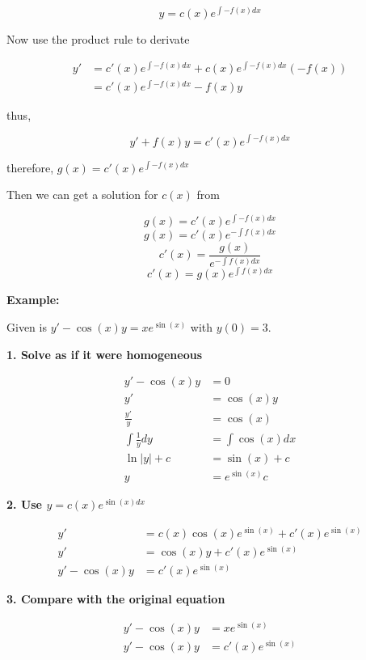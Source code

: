 \[
    y = c(x) e^{\int -f(x) dx}
\]

Now use the product rule to derivate

\begin{align*}
    y' &= c'(x) e^{\int -f(x) dx} + c(x)e^{\int -f(x) dx}(-f(x))\\
    &= c'(x)e^{\int -f(x) dx} - f(x)y
\end{align*}

thus, 

\[
    y' + f(x)y = c'(x)e^{\int -f(x) dx}
\]

therefore, \(g(x) = c'(x)e^{\int -f(x) dx}\)
\vspace{\baselineskip}

Then we can get a solution for \(c(x)\) from

\[
    g(x) = c'(x)e^{\int -f(x) dx}
\]
\[
    g(x) = c'(x)e^{-\int f(x) dx}
\]
\[
    c'(x) = \frac{g(x)}{e^{-\int f(x) dx}}
\]
\[
    c'(x) = g(x)e^{\int f(x) dx}
\]

\textbf{Example: }
\vspace{\baselineskip}

Given is \(y' -\cos(x)y = x e^{\sin(x)}\) with \(y(0) = 3\).
\vspace{\baselineskip}

\textbf{1. Solve as if it were homogeneous}

\begin{align*}
    y' -\cos(x)y &= 0\\
    y' &= \cos(x)y\\
    \frac{y'}{y} &= \cos(x)\\
    \int\frac{1}{y}dy &= \int \cos(x)dx \\
    \ln |y| + c &= \sin(x) + c \\
    y &= e^{\sin(x)}c 
\end{align*}

\textbf{2. Use \(y = c(x)e^{\sin(x)dx}\)}

\begin{align*}
    y' &= c(x)\cos(x)e^{\sin(x)} + c'(x)e^{\sin(x)}\\
    y' &= \cos(x)y + c'(x)e^{\sin(x)}\\
    y' - \cos(x)y &= c'(x)e^{\sin(x)}
\end{align*}
    
\textbf{3. Compare with the original equation}

\begin{align*}
    y' -\cos(x)y &= x e^{\sin(x)}\\
    y' - \cos(x)y &= c'(x)e^{\sin(x)}
\end{align*}


